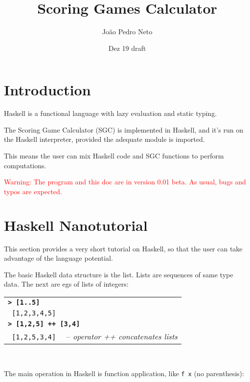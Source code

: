 \documentclass[a4paper,12pt]{article}
\newcommand{\bash}[1]{\small\textbf{\lstinline§> #1§}\\}
\newcommand{\out}[1]{\small\lstinline§ #1§}
\newcommand{\hsklcmt}[1]{~~-- \footnotesize\textit{#1}}
\newcommand{\haskellCode}{\fontfamily{pcr}\selectfont}
\newenvironment{sgcode}
	{ \haskellCode
	  \begin{tabular}{|p{0.9\textwidth}|}
      \hline	
	}
	{ \\\hline  
      \end{tabular} \\
	  \par 
	}
\begin{document}
\title{Scoring Games Calculator}
\author{Jo\~{a}o Pedro Neto}
\date{Dez 19 draft}
\maketitle

\newpage
%
%

\tableofcontents

\newpage \section*{Introduction}

Haskell is a functional language with lazy evaluation and static typing.

The Scoring Game Calculator (SGC) is implemented in Haskell, and it's run on 
the Haskell interpreter, provided the adequate module is imported. 

This means the user can mix Haskell code and SGC functions to perform computations.

\textcolor{red}{Warning: The program and this doc are in version 0.01 beta. As usual, bugs and typos are expected.}

\section{Haskell Nanotutorial}

This section provides a very short tutorial on Haskell, so that the user can
take advantage of the language potential.

The basic Haskell data structure is the list. Lists are sequences of
same type data. The next are egs of lists of integers:

\begin{sgcode}
\bash{[1..5]}
\out{[1,2,3,4,5]} \\
\bash{[1,2,5] ++ [3,4]} 
\out{[1,2,5,3,4]} \hsklcmt{operator ++ concatenates lists}
\end{sgcode}

The main operation in Haskell is function application, like \verb|f x| (no parenthesis):
\end{document}
